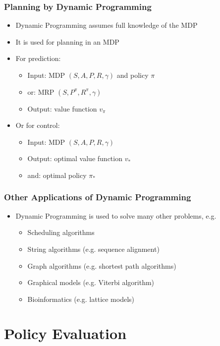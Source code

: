 \documentclass[varwidth]{article}
\begin{document}
\subsubsection{Planning by Dynamic Programming}
\begin{itemize}
    \item Dynamic Programming assumes full knowledge of the MDP
    \item It is used for planning in an MDP
    \item For prediction:
    \begin{itemize}
        \item Input: MDP $(S,A,P,R,\gamma)$ and policy $\pi$
        \item or: MRP $(S,P^\pi,R^\pi,\gamma)$
        \item Output: value function $v_\pi$
    \end{itemize}
    \item Or for control: 
    \begin{itemize}
        \item Input: MDP $(S,A, P,R,\gamma)$
        \item Output: optimal value function $v_*$
        \item and: optimal policy $\pi_*$
    \end{itemize}
\end{itemize}
\subsubsection{Other Applications of Dynamic Programming}
\begin{itemize}    
    \item Dynamic Programming is used to solve many other problems, e.g.
    \begin{itemize}
        \item Scheduling algorithms
        \item String algorithms (e.g. sequence alignment)
        \item Graph algorithms (e.g. shortest path algorithms)
        \item Graphical models (e.g. Viterbi algorithm)
        \item Bioinformatics (e.g. lattice models)
    \end{itemize}
\end{itemize}
\section{Policy Evaluation}
\end{document}
